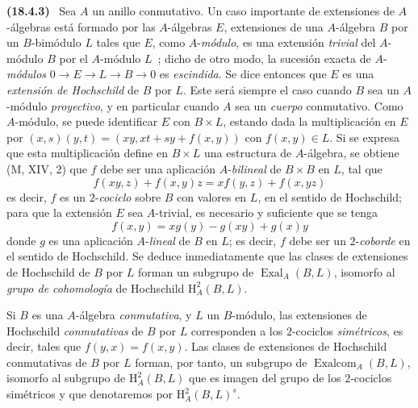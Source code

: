\documentclass[10pt,oneside]{book}
\makeatletter
\newcommand{\setmanualcurrentlabel}[1]{\def\@currentlabel{#1}}
\newenvironment{env}[1][]{\setmanualcurrentlabel{#1}\par\medskip\noindent\textbf{(#1)}\ }{\par}
\providecommand{\setmin}{-}%
\makeatother
\begin{document}
\begin{env}[18.4.3]
\label{0.18.4.3-es}
Sea $A$ un anillo conmutativo. Un caso importante de extensiones de
$A$-álgebras está formado por las $A$-álgebras $E$, extensiones de una $A$-álgebra $B$
por un $B$-bimódulo $L$ tales que $E$, como $A$-\emph{módulo}, es una
extensión \emph{trivial} del $A$-módulo $B$ por el $A$-módulo $L$~; dicho de otro
modo, la sucesión exacta de $A$-\emph{módulos}
$0\to E\to L\to B\to0$ es \emph{escindida}. Se dice entonces que $E$ es una
\emph{extensión de Hochschild} de $B$ por $L$. Este será siempre el caso cuando
$B$ sea un $A$-módulo \emph{proyectivo}, y en particular cuando $A$ sea un
\emph{cuerpo} conmutativo. Como $A$-módulo, se puede identificar $E$ con
$B\times L$, estando dada la multiplicación en $E$ por
$(x,s)(y,t)=(xy,xt+sy+f(x,y))$ con $f(x,y)\in L$. Si se expresa que esta
multiplicación define en $B\times L$ una estructura de $A$-álgebra, se obtiene
(M, XIV, 2) que $f$ debe ser una aplicación $A$-\emph{bilineal} de
$B\times B$ en $L$, tal que
\begin{equation}
\label{0.18.4.3.1-es}
\tag{18.4.3.1}
  f(xy,z)+f(x,y)z=xf(y,z)+f(x,yz)
\end{equation}
es decir, $f$ es un $2$-\emph{cociclo} sobre $B$ con valores en $L$, en el
sentido de Hochschild; para que la extensión $E$ sea $A$-trivial, es necesario
y suficiente que se tenga
\begin{equation}
\label{0.18.4.3.2-es}
\tag{18.4.3.2}
  f(x,y)=xg(y)\setmin g(xy)+g(x)y
\end{equation}
donde $g$ es una aplicación $A$-\emph{lineal} de $B$ en $L$; es decir, $f$
debe ser un $2$-\emph{coborde} en el sentido de Hochschild. Se deduce
inmediatamente que las clases de extensiones de Hochschild de $B$ por $L$
forman un subgrupo de $\operatorname{Exal}_A(B,L)$, isomorfo al \emph{grupo de
cohomología} de Hochschild $\mathrm H_A^2(B,L)$.

Si $B$ es una $A$-álgebra \emph{conmutativa}, y $L$ un $B$-módulo, las
extensiones de Hochschild \emph{conmutativas} de $B$ por $L$ corresponden a los
$2$-cociclos \emph{simétricos}, es decir, tales que $f(y,x)=f(x,y)$. Las clases
de extensiones de Hochschild conmutativas de $B$ por $L$ forman, por tanto, un
subgrupo de $\operatorname{Exalcom}_A(B,L)$, isomorfo al subgrupo de
$\mathrm H_A^2(B,L)$ que es imagen del grupo de los $2$-cociclos simétricos y
que denotaremos por $\mathrm H_A^2(B,L)^s$.
\end{env}
\end{document}

